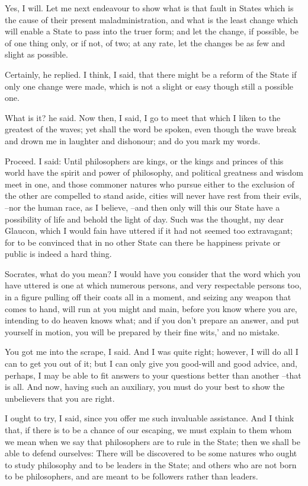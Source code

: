 Yes, I will.
Let me next endeavour to show what is that fault in States which is the cause of their present maladministration, and what is the least change which will enable a State to pass into the truer form; and let the change, if possible, be of one thing only, or if not, of two; at any rate, let the changes be as few and slight as possible.

Certainly, he replied.
I think, I said, that there might be a reform of the State if only one change were made, which is not a slight or easy though still a possible one.

What is it? he said.
Now then, I said, I go to meet that which I liken to the greatest of the waves; yet shall the word be spoken, even though the wave break and drown me in laughter and dishonour; and do you mark my words.

Proceed.
I said: Until philosophers are kings, or the kings and princes of this world have the spirit and power of philosophy, and political greatness and wisdom meet in one, and those commoner natures who pursue either to the exclusion of the other are compelled to stand aside, cities will never have rest from their evils, --nor the human race, as I believe, --and then only will this our State have a possibility of life and behold the light of day. Such was the thought, my dear Glaucon, which I would fain have uttered if it had not seemed too extravagant; for to be convinced that in no other State can there be happiness private or public is indeed a hard thing.

Socrates, what do you mean? I would have you consider that the word which you have uttered is one at which numerous persons, and very respectable persons too, in a figure pulling off their coats all in a moment, and seizing any weapon that comes to hand, will run at you might and main, before you know where you are, intending to do heaven knows what; and if you don't prepare an answer, and put yourself in motion, you will be prepared by their fine wits,' and no mistake.

You got me into the scrape, I said.
And I was quite right; however, I will do all I can to get you out of it; but I can only give you good-will and good advice, and, perhaps, I may be able to fit answers to your questions better than another --that is all. And now, having such an auxiliary, you must do your best to show the unbelievers that you are right.

I ought to try, I said, since you offer me such invaluable assistance. And I think that, if there is to be a chance of our escaping, we must explain to them whom we mean when we say that philosophers are to rule in the State; then we shall be able to defend ourselves: There will be discovered to be some natures who ought to study philosophy and to be leaders in the State; and others who are not born to be philosophers, and are meant to be followers rather than leaders.

